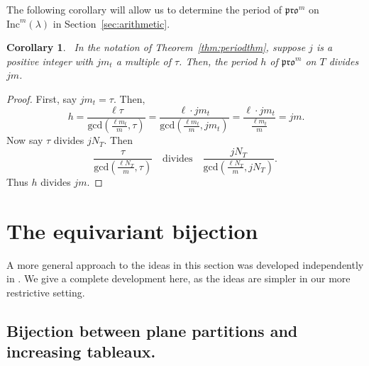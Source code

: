 \documentclass[12pt]{amsart}
\newtheorem{corollary}[theorem]{Corollary}
\theoremstyle{definition}
\theoremstyle{remark}
\numberwithin{equation}{section}
\newcommand{\inc}{\ensuremath{\mathrm{Inc}}}
\newcommand{\pro}{\mathfrak{pro}}
\begin{document}
The following corollary will allow us to determine the period of $\pro^m$ on $\inc^m(\lambda)$ in Section~\ref{sec:arithmetic}. 
\\
\begin{corollary}~\label{corr:pdbound}
In the notation of Theorem~\ref{thm:periodthm}, suppose $j$ is a positive integer with $j m_t$ a multiple of $\tau$. Then, the period $h$ of $\pro^m$ on $T$ divides $j m$. 
\end{corollary} 
\begin{proof}
First, say $j m_t = \tau$. Then,
\begin{equation}~\label{eq:pdbound} h=  \frac{\ell \tau}{\text{gcd}(\frac{\ell m_t}{m},\tau)} = \frac{\ell \cdot j m_t}{\text{gcd}(\frac{\ell m_t}{m},j m_t)} = \frac{\ell \cdot j m_t}{\frac{\ell m_t}{m}} = jm. 
\end{equation}
Now say $\tau$ divides $jN_T$. Then \[ \frac{\tau}{\text{gcd}(\frac{\ell N_T}{m},\tau)} \ \ \  \text{    divides   } \ \ \ \frac{j N_T}{\text{gcd}(\frac{\ell N_T}{m},j N_T)}.\] Thus $h$ divides $j m$. 
\end{proof}

\section{The equivariant bijection}\label{sec:equivariant}

A more general approach to the ideas in this section was developed independently in \cite{Dilks.Striker.Vorland}. We give a complete development here, as the ideas are simpler in our more restrictive setting.

\subsection{Bijection between plane partitions and increasing tableaux.} 
\end{document}
